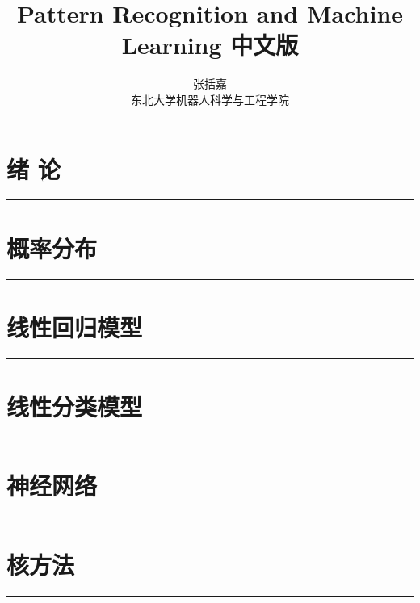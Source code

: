 \documentclass{book}
\author{张括嘉 \\ 东北大学机器人科学与工程学院}
\renewcommand {\thetable} {\thechapter{}.\arabic{table}}
\renewcommand {\thefigure} {\thechapter{}.\arabic{figure}}
\numberwithin{equation}{chapter}
\begin{document}
\title{Pattern Recognition and Machine Learning 中文版}
\date{}
	\chapter{绪 \quad 论}
	\noindent\rule[0.25\baselineskip]{\textwidth}{1pt}
	\renewcommand {\thetable} {\thechapter{}.\arabic{table}}
	\renewcommand {\thefigure} {\thechapter{}.\arabic{figure}}
	
	\chapter{概率分布}
	\noindent\rule[0.25\baselineskip]{\textwidth}{1pt}
	\renewcommand {\thetable} {\thechapter{}.\arabic{table}}
	\renewcommand {\thefigure} {\thechapter{}.\arabic{figure}}
	
	\chapter{线性回归模型}
	\noindent\rule[0.25\baselineskip]{\textwidth}{1pt}
	\renewcommand {\thetable} {\thechapter{}.\arabic{table}}
	\renewcommand {\thefigure} {\thechapter{}.\arabic{figure}}
	
	\chapter{线性分类模型}
	\noindent\rule[0.25\baselineskip]{\textwidth}{1pt}
	\renewcommand {\thetable} {\thechapter{}.\arabic{table}}
	\renewcommand {\thefigure} {\thechapter{}.\arabic{figure}}

	\chapter{神经网络}
	\noindent\rule[0.25\baselineskip]{\textwidth}{1pt}
	\renewcommand {\thetable} {\thechapter{}.\arabic{table}}
	\renewcommand {\thefigure} {\thechapter{}.\arabic{figure}}
	
	\chapter{核方法}
	\noindent\rule[0.25\baselineskip]{\textwidth}{1pt}
	\renewcommand {\thetable} {\thechapter{}.\arabic{table}}
	\renewcommand {\thefigure} {\thechapter{}.\arabic{figure}}
\end{document}
